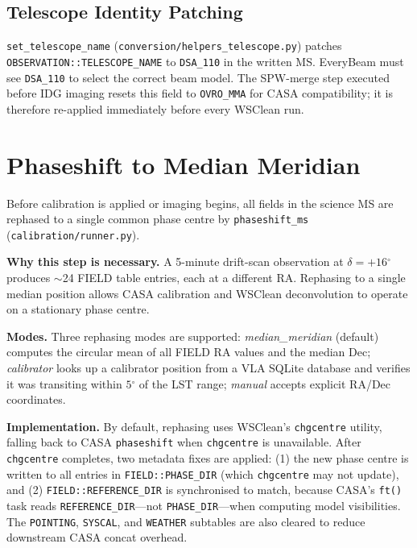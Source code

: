 \documentclass[12pt,a4paper]{article}
\newcommand{\degr}{\ensuremath{^\circ}}
\begin{document}
\subsection{Telescope Identity Patching}

\texttt{set\_telescope\_name} (\texttt{conversion/helpers\_telescope.py})
patches \texttt{OBSERVATION::TELESCOPE\_NAME} to \texttt{DSA\_110} in the
written MS.  EveryBeam must see \texttt{DSA\_110} to select the correct
beam model.  The SPW-merge step executed before IDG imaging resets this
field to \texttt{OVRO\_MMA} for CASA compatibility; it is therefore
re-applied immediately before every WSClean run.

\section{Phaseshift to Median Meridian}

Before calibration is applied or imaging begins, all fields in the science
MS are rephased to a single common phase centre by \texttt{phaseshift\_ms}
(\texttt{calibration/runner.py}).

\textbf{Why this step is necessary.}  A 5-minute drift-scan observation at
$\delta = +16\degr$ produces $\sim$24 FIELD table entries, each at a different
RA.  Rephasing to a single median position allows CASA calibration and WSClean
deconvolution to operate on a stationary phase centre.

\textbf{Modes.}  Three rephasing modes are supported:
\textit{median\_meridian} (default) computes the circular mean of all
FIELD RA values and the median Dec;
\textit{calibrator} looks up a calibrator position from a VLA SQLite database
and verifies it was transiting within $5\degr$ of the LST range;
\textit{manual} accepts explicit RA/Dec coordinates.

\textbf{Implementation.}  By default, rephasing uses WSClean's
\texttt{chgcentre} utility, falling back to CASA \texttt{phaseshift} when
\texttt{chgcentre} is unavailable.  After \texttt{chgcentre} completes, two
metadata fixes are applied: (1) the new phase centre is written to all entries
in \texttt{FIELD::PHASE\_DIR} (which \texttt{chgcentre} may not update),
and (2) \texttt{FIELD::REFERENCE\_DIR} is synchronised to match, because
CASA's \texttt{ft()} task reads \texttt{REFERENCE\_DIR}---not
\texttt{PHASE\_DIR}---when computing model visibilities.
The \texttt{POINTING}, \texttt{SYSCAL}, and \texttt{WEATHER} subtables
are also cleared to reduce downstream CASA concat overhead.
\end{document}
